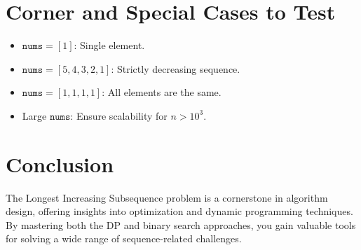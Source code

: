 \section*{Corner and Special Cases to Test}
\begin{itemize}
    \item \( \texttt{nums} = [1] \): Single element.
    \item \( \texttt{nums} = [5, 4, 3, 2, 1] \): Strictly decreasing sequence.
    \item \( \texttt{nums} = [1, 1, 1, 1] \): All elements are the same.
    \item Large \( \texttt{nums} \): Ensure scalability for \( n > 10^3 \).
\end{itemize}

\section*{Conclusion}
The Longest Increasing Subsequence problem is a cornerstone in algorithm design, offering insights into optimization and dynamic programming techniques. By mastering both the DP and binary search approaches, you gain valuable tools for solving a wide range of sequence-related challenges.